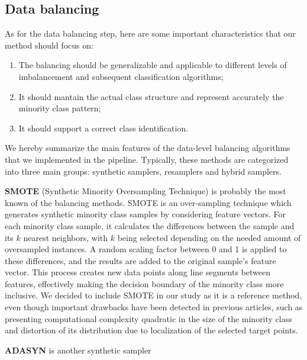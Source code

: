 \subsection{Data balancing}
As for the data balancing step, here are some important characteristics that our method should focus on:
\begin{enumerate}[label=$\bullet$]
\item The balancing should be generalizable and applicable to different levels of imbalancement and subsequent classification algorithms;
\item It should mantain the actual class structure and represent accurately the minority class pattern;
\item It should support a correct class identification.
\end{enumerate}
   
We hereby summarize the main features of the data-level balancing algorithms that we implemented in the pipeline. Typically, these methods are categorized into three main groups: synthetic samplers, resamplers and hybrid samplers.

\textbf{SMOTE} (Synthetic Minority Oversampling Technique) is probably the most known of the balancing methods. 
SMOTE is an over-sampling technique which generates synthetic minority class samples by considering feature vectors. For each minority class sample, it calculates the differences between the sample and its $k$ nearest neighbors, with $k$ being selected depending on the needed amount of oversampled instances. A random scaling factor between 0 and 1 is applied to these differences, and the results are added to the original sample's feature vector. This process creates new data points along line segments between features, effectively making the decision boundary of the minority class more inclusive. We decided to include SMOTE in our study as it is a reference method, even though important drawbacks have been detected in previous articles, such as presenting computational complexity quadratic in the size of the minority class and distortion of its distribution due to localization of the selected target points.

\textbf{ADASYN} is another synthetic sampler 